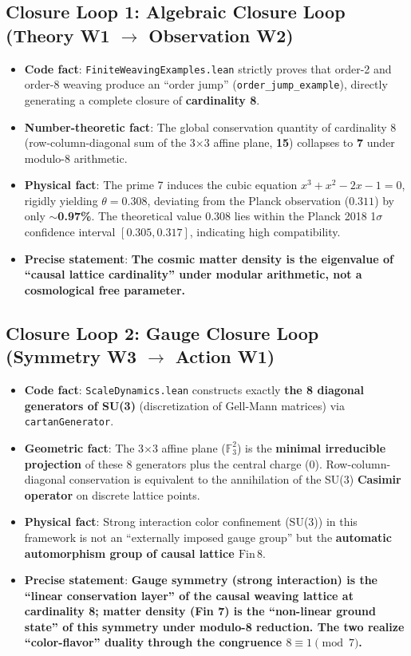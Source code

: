 \documentclass[aps,prd,twocolumn,nofootinbib,floatfix]{revtex4-2}
\begin{document}
\subsection{Closure Loop 1: Algebraic Closure Loop (Theory W1 $\to$ Observation W2)}

\begin{itemize}
    \item \textbf{Code fact}: \texttt{FiniteWeavingExamples.lean} strictly proves that order-2 and order-8 weaving produce an ``order jump'' (\texttt{order\_jump\_example}), directly generating a complete closure of \textbf{cardinality 8}.
    \item \textbf{Number-theoretic fact}: The global conservation quantity of cardinality 8 (row-column-diagonal sum of the 3$\times$3 affine plane, \textbf{15}) collapses to \textbf{7} under modulo-8 arithmetic.
    \item \textbf{Physical fact}: The prime 7 induces the cubic equation $x^3 + x^2 - 2x - 1 = 0$, rigidly yielding $\theta = 0.308$, deviating from the Planck observation ($0.311$) by only \textbf{$\sim$0.97\%}. The theoretical value 0.308 lies within the Planck 2018 1$\sigma$ confidence interval $[0.305, 0.317]$, indicating high compatibility.
    \item \textbf{Precise statement}: \textbf{The cosmic matter density is the eigenvalue of ``causal lattice cardinality'' under modular arithmetic, not a cosmological free parameter.}
\end{itemize}

\subsection{Closure Loop 2: Gauge Closure Loop (Symmetry W3 $\to$ Action W1)}

\begin{itemize}
    \item \textbf{Code fact}: \texttt{ScaleDynamics.lean} constructs exactly \textbf{the 8 diagonal generators of SU(3)} (discretization of Gell-Mann matrices) via \texttt{cartanGenerator}.
    \item \textbf{Geometric fact}: The 3$\times$3 affine plane ($\mathbb{F}_3^2$) is the \textbf{minimal irreducible projection} of these 8 generators plus the central charge (0). Row-column-diagonal conservation is equivalent to the annihilation of the SU(3) \textbf{Casimir operator} on discrete lattice points.
    \item \textbf{Physical fact}: Strong interaction color confinement (SU(3)) in this framework is not an ``externally imposed gauge group'' but the \textbf{automatic automorphism group of causal lattice $\text{Fin}\,8$}.
    \item \textbf{Precise statement}: \textbf{Gauge symmetry (strong interaction) is the ``linear conservation layer'' of the causal weaving lattice at cardinality 8; matter density (Fin 7) is the ``non-linear ground state'' of this symmetry under modulo-8 reduction. The two realize ``color-flavor'' duality through the congruence $8 \equiv 1 \pmod{7}$.}
\end{itemize}
\end{document}
